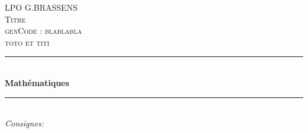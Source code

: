 \documentclass[12pt,%
addpoints,%
]{exam}
\begin{document}
\begin{titlepage}

\newcommand{\HRule}{\rule{\linewidth}{0.5mm}} 							%
\center 
 
\textsc{\LARGE LPO G.BRASSENS}\\[1cm]

\textsc{\Large Titre\\ \small{ genCode : blablabla}}\\[5cm]
\textsc{\large toto et titi}\\[1cm] 										%
\HRule \\[0.8cm]
{ \huge \bfseries Mathématiques}\\[0.7cm]								%
\HRule \\[5cm]
\large
\emph{Consignes:}\\%

\vfill 
\end{titlepage}

\clearpage
\end{document}
